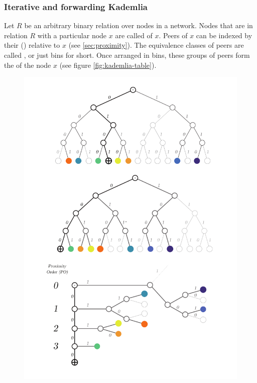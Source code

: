 \subsubsection{Iterative and forwarding Kademlia}

Let $R$ be an arbitrary binary relation over nodes in a network. Nodes that are in relation $R$ with a particular node $x$ are called  of $x$. Peers of $x$ can be indexed by their  () relative to $x$ (see \ref{sec:proximity}).
The equivalence classes of peers are called , or just bins for short. Once arranged in bins, these groups of peers form the  of the node $x$ (see figure \ref{fig:kademlia-table}). 



\begin{figure}[htbp]
   \centering
    \includegraphics[width=.88\textwidth]{fig/kademlia-35.pdf}

\end{figure}
